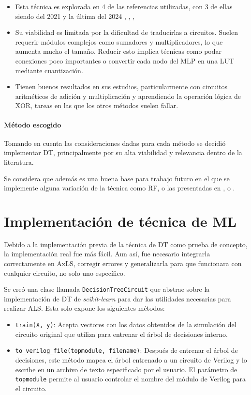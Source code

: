 \begin{itemize}
  \item Esta técnica es explorada en 4 de las referencias utilizadas, con 3
    de ellas siendo del 2021 y la última del 2024
    \cite{boroumand_learning_2021}, \cite{miyasaka_logic_2021},
    \cite{rai_logic_2021}, \cite{prats_ramos_impact_2024}
  \item Su viabilidad es limitada por la dificultad de traducirlas a
    circuitos. Suelen requerir módulos complejos como sumadores y
    multiplicadores, lo que aumenta mucho el tamaño. Reducir esto implica
    técnicas como podar conexiones poco importantes o convertir cada nodo del
    MLP en una LUT mediante cuantización.
  \item Tienen buenos resultados en sus estudios, particularmente con
    circuitos aritméticos de adición y multiplicación y aprendiendo la
    operación lógica de XOR, tareas en las que los otros métodos suelen
    fallar.
\end{itemize}

\paragraph{Método escogido}

Tomando en cuenta las consideraciones dadas para cada método se decidió
implementar DT, principalmente por su alta viabilidad y relevancia dentro de la
literatura.

Se considera que además es una buena base para trabajo futuro en el que se implemente alguna variación de la técnica como RF, o las presentadas en \cite{hu_optdtals_2024}, \cite{zeng_sampling-based_2021} o \cite{huang_circuit_2023}.

\section{Implementación de técnica de ML}

Debido a la implementación previa de la técnica de DT como prueba de concepto,
la implementación real fue más fácil. Aun así, fue necesario integrarla
correctamente en AxLS, corregir errores y generalizarla para que funcionara con
cualquier circuito, no solo uno específico.

Se creó una clase llamada \texttt{DecisionTreeCircuit} que abstrae sobre la
implementación de DT de \emph{scikit-learn} para dar las utilidades necesarias
para realizar ALS. Esta solo expone los siguientes métodos:

\begin{itemize}
  \item \texttt{train(X, y)}: Acepta vectores con los datos obtenidos de la
    simulación del circuito original que utiliza para entrenar el árbol de
    decisiones interno.
  \item \texttt{to\_verilog\_file(topmodule, filename)}: Después de entrenar el
    árbol de decisiones, este método mapea el árbol entrenado a un circuito de
    Verilog y lo escribe en un archivo de texto especificado por el usuario. El
    parámetro de \texttt{topmodule} permite al usuario controlar el nombre del
    módulo de Verilog para el circuito.
\end{itemize}

